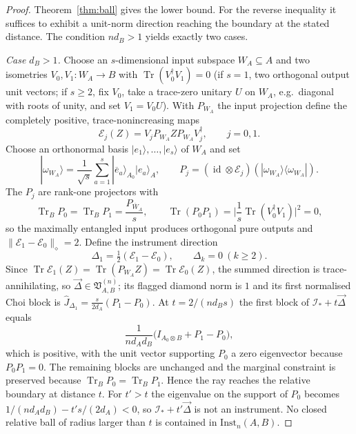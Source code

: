 \documentclass[11pt,a4paper]{article}
\newcommand{\Inst}{\mathrm{Inst}}
\newcommand{\Tr}{\operatorname{Tr}}
\newcommand{\id}{\operatorname{id}}
\newcommand{\Jhat}{\widehat J}
\newcommand{\vD}{\vec{\Delta}}
\begin{document}
\begin{proof}
Theorem~\ref{thm:ball} gives the lower bound. For the reverse inequality it suffices to exhibit a unit-norm direction reaching the boundary at the stated distance. The condition $nd_B>1$ yields exactly two cases.

\emph{Case $d_B>1$.} Choose an $s$-dimensional input subspace $W_A\subseteq A$ and two isometries $V_0,V_1:W_A\to B$ with $\Tr(V_0^\dagger V_1)=0$ (if $s=1$, two orthogonal output unit vectors; if $s\ge2$, fix $V_0$, take a trace-zero unitary $U$ on $W_A$, e.g.\ diagonal with roots of unity, and set $V_1=V_0U$). With $P_{W_A}$ the input projection define the completely positive, trace-nonincreasing maps
\[
\mathcal E_j(Z)=V_jP_{W_A}ZP_{W_A}V_j^\dagger,\qquad j=0,1.
\]
Choose an orthonormal basis $|e_1\rangle,\dots,|e_s\rangle$ of $W_A$ and set
\[
|\omega_{W_A}\rangle=\frac1{\sqrt s}\sum_{a=1}^s|\overline e_a\rangle_{A_0}|e_a\rangle_A,
\qquad
P_j=(\id\otimes\mathcal E_j)(|\omega_{W_A}\rangle\langle\omega_{W_A}|).
\]
The $P_j$ are rank-one projectors with
\[
\Tr_BP_0=\Tr_BP_1=\frac{P_{\overline W_A}}s,
\qquad
\Tr(P_0P_1)=\Big|\frac1s\Tr(V_0^\dagger V_1)\Big|^2=0,
\]
so the maximally entangled input produces orthogonal pure outputs and $\|\mathcal E_1-\mathcal E_0\|_\diamond=2$. Define the instrument direction
\[
\Delta_1=\tfrac12(\mathcal E_1-\mathcal E_0),\qquad \Delta_k=0\ (k\ge2).
\]
Since $\Tr\mathcal E_1(Z)=\Tr(P_{W_A}Z)=\Tr\mathcal E_0(Z)$, the summed direction is trace-annihilating, so $\vD\in\mathfrak V_{A,B}^{(n)}$; its flagged diamond norm is $1$ and its first normalised Choi block is $\Jhat_{\Delta_1}=\tfrac{s}{2d_A}(P_1-P_0)$. At $t=2/(nd_Bs)$ the first block of $\mathcal I_*+t\vD$ equals
\[
\frac1{nd_Ad_B}\big(I_{A_0\otimes B}+P_1-P_0\big),
\]
which is positive, with the unit vector supporting $P_0$ a zero eigenvector because $P_0P_1=0$. The remaining blocks are unchanged and the marginal constraint is preserved because $\Tr_BP_0=\Tr_BP_1$. Hence the ray reaches the relative boundary at distance $t$. For $t'>t$ the eigenvalue on the support of $P_0$ becomes $1/(nd_Ad_B)-t's/(2d_A)<0$, so $\mathcal I_*+t'\vD$ is not an instrument. No closed relative ball of radius larger than $t$ is contained in $\Inst_n(A,B)$.


\end{proof}
\end{document}
